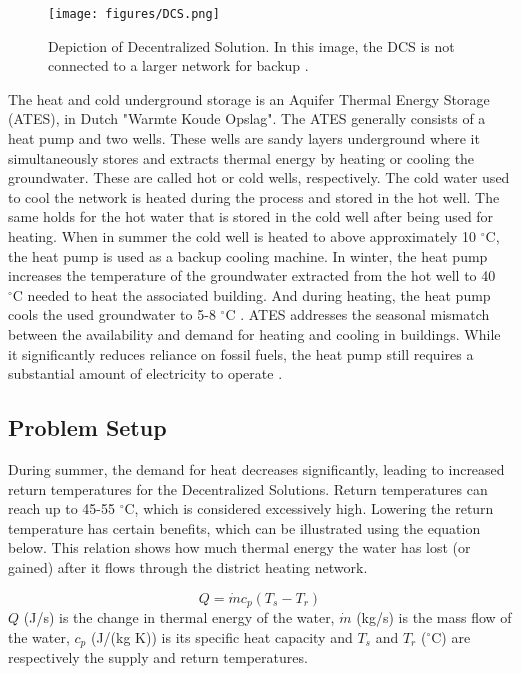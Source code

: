 \begin{figure}[h]
    \centering
    \texttt{[image: figures/DCS.png]}
    \caption{Depiction of Decentralized Solution. In this image, the DCS is not connected to a larger network for backup \cite{DCSeneco}.}
    \label{fig:DCS}
\end{figure}
The heat and cold underground storage is an Aquifer Thermal Energy Storage (ATES), in Dutch "Warmte Koude Opslag". The ATES generally consists of a heat pump and two wells. These wells are sandy layers underground where it simultaneously stores and extracts thermal energy by heating or cooling the groundwater. These are called hot or cold wells, respectively. The cold water used to cool the network is heated during the process and stored in the hot well. The same holds for the hot water that is stored in the cold well after being used for heating. When in summer the cold well is heated to above approximately 10 $^{\circ}\text{C}$, the heat pump is used as a backup cooling machine. In winter, the heat pump increases the temperature of the groundwater extracted from the hot well to 40 $^{\circ}\text{C}$ needed to heat the associated building. And during heating, the heat pump cools the used groundwater to 5-8 $^{\circ}\text{C}$ \cite{bloemendal2018hidden}. ATES addresses the seasonal mismatch between the availability and demand for heating and cooling in buildings. While it significantly reduces reliance on fossil fuels, the heat pump still requires a substantial amount of electricity to operate \cite{tudelft_ates_triplet}.

\subsection{Problem Setup}
During summer, the demand for heat decreases significantly, leading to increased return temperatures for the Decentralized Solutions. Return temperatures can reach up to 45-55 $^{\circ}\text{C}$, which is considered excessively high. Lowering the return temperature has certain benefits, which can be illustrated using the equation below. This relation shows how much thermal energy the water has lost (or gained) after it flows through the district heating network. 

\begin{equation}
    Q = \dot{m} c_p (T_s - T_r)
\end{equation}
$Q$ (J/s) is the change in thermal energy of the water, $\dot{m}$ (kg/s) is the mass flow of the water, $c_p$ (J/(kg K)) is its specific heat capacity and $T_s$ and $T_r$ ($^{\circ}\text{C}$) are respectively the supply and return temperatures. 

